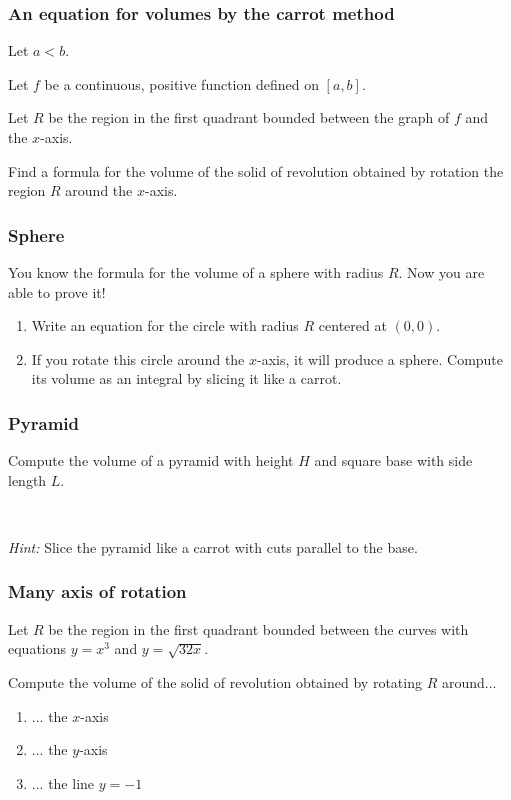 \documentclass[14pt]{beamer}
\date{}
\title{}
\author{}
\newcommand {\DS} [1] {${\displaystyle #1}$}
\begin{document}

\begin{frame}[t]
\frametitle{An equation for volumes by the carrot method}

Let $a < b$.

Let $f$ be a continuous, positive function defined on $[a,b]$.

Let $R$ be the region in the first quadrant bounded between the graph of $f$ and the $x$-axis.

Find a formula for the volume of the solid of revolution obtained by rotation the region $R$ around the $x$-axis.

\end{frame}
\begin{frame}[t]
\frametitle{Sphere}

You know the formula for the volume of a sphere with radius $R$. 
  Now you are able to prove it!

\begin{enumerate}
	\item  Write an equation for the circle with radius $R$ centered at $(0,0)$.
	\item    If you rotate this circle around the $x$-axis, it will produce a sphere.  Compute its volume as an integral by slicing it like a carrot.
\end{enumerate}

\end{frame}
\begin{frame}[t]
\frametitle{Pyramid}

Compute the volume of a pyramid with height $H$ and square base with side length $L$.

\

\emph{Hint:}  Slice the pyramid like a carrot with cuts parallel to the base.

\end{frame}
\begin{frame}[t]
\frametitle{Many axis of rotation}

Let $R$ be the region in the first quadrant bounded between the curves with equations \DS{y = x^3} and \DS{y=\sqrt{32x}}.  

Compute the volume of the solid of revolution obtained by rotating $R$ around...
	\begin{enumerate}
		\item ... the $x$-axis
		\item ... the $y$-axis
		\item ... the line $y=-1$
	\end{enumerate}

\end{frame}
\end{document}
